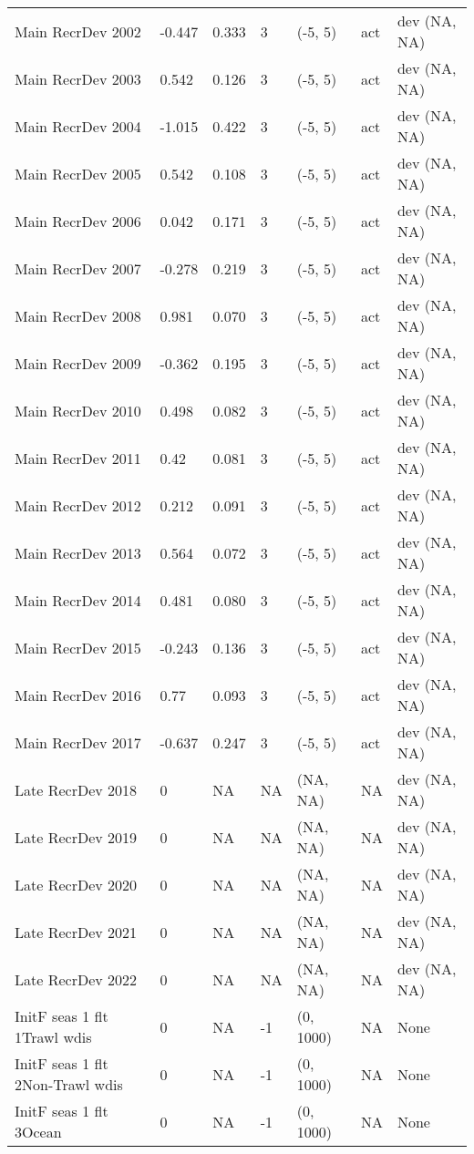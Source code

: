 \documentclass[11pt,
  english,
  letterpaper,
]{article}
\begin{document}
\begin{landscape}
\begin{longtable}[t]{>{\raggedright\arraybackslash}p{7.5cm}lllll>{\raggedright\arraybackslash}p{3.5cm}}
Main RecrDev 2002 & -0.447 & 0.333 & 3 & (-5, 5) & act & dev (NA, NA)\\
Main RecrDev 2003 & 0.542 & 0.126 & 3 & (-5, 5) & act & dev (NA, NA)\\
Main RecrDev 2004 & -1.015 & 0.422 & 3 & (-5, 5) & act & dev (NA, NA)\\
Main RecrDev 2005 & 0.542 & 0.108 & 3 & (-5, 5) & act & dev (NA, NA)\\
Main RecrDev 2006 & 0.042 & 0.171 & 3 & (-5, 5) & act & dev (NA, NA)\\
Main RecrDev 2007 & -0.278 & 0.219 & 3 & (-5, 5) & act & dev (NA, NA)\\
Main RecrDev 2008 & 0.981 & 0.070 & 3 & (-5, 5) & act & dev (NA, NA)\\
Main RecrDev 2009 & -0.362 & 0.195 & 3 & (-5, 5) & act & dev (NA, NA)\\
Main RecrDev 2010 & 0.498 & 0.082 & 3 & (-5, 5) & act & dev (NA, NA)\\
Main RecrDev 2011 & 0.42 & 0.081 & 3 & (-5, 5) & act & dev (NA, NA)\\
Main RecrDev 2012 & 0.212 & 0.091 & 3 & (-5, 5) & act & dev (NA, NA)\\
Main RecrDev 2013 & 0.564 & 0.072 & 3 & (-5, 5) & act & dev (NA, NA)\\
Main RecrDev 2014 & 0.481 & 0.080 & 3 & (-5, 5) & act & dev (NA, NA)\\
Main RecrDev 2015 & -0.243 & 0.136 & 3 & (-5, 5) & act & dev (NA, NA)\\
Main RecrDev 2016 & 0.77 & 0.093 & 3 & (-5, 5) & act & dev (NA, NA)\\
Main RecrDev 2017 & -0.637 & 0.247 & 3 & (-5, 5) & act & dev (NA, NA)\\
Late RecrDev 2018 & 0 & NA & NA & (NA, NA) & NA & dev (NA, NA)\\
Late RecrDev 2019 & 0 & NA & NA & (NA, NA) & NA & dev (NA, NA)\\
Late RecrDev 2020 & 0 & NA & NA & (NA, NA) & NA & dev (NA, NA)\\
Late RecrDev 2021 & 0 & NA & NA & (NA, NA) & NA & dev (NA, NA)\\
Late RecrDev 2022 & 0 & NA & NA & (NA, NA) & NA & dev (NA, NA)\\
InitF seas 1 flt 1Trawl wdis & 0 & NA & -1 & (0, 1000) & NA & None\\
InitF seas 1 flt 2Non-Trawl wdis & 0 & NA & -1 & (0, 1000) & NA & None\\
InitF seas 1 flt 3Ocean & 0 & NA & -1 & (0, 1000) & NA & None\\

\end{longtable}
\end{landscape}
\end{document}
